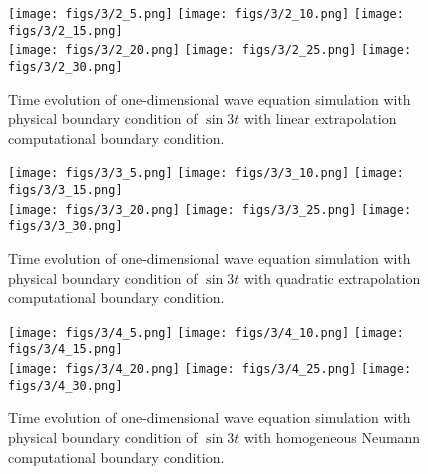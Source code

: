 \documentclass[11pt]{article}
\begin{document}
\begin{enumerate}
        \begin{figure}[ht]
        \begin{center}
        \texttt{[image: figs/3/2\_5.png]}
        \texttt{[image: figs/3/2\_10.png]}
        \texttt{[image: figs/3/2\_15.png]}\\
        \texttt{[image: figs/3/2\_20.png]}
        \texttt{[image: figs/3/2\_25.png]}
        \texttt{[image: figs/3/2\_30.png]}\\
        \end{center}
        \caption{Time evolution of one-dimensional wave equation simulation with physical boundary condition
                of $\sin 3 t$ with linear extrapolation computational boundary condition.}
        \label{fig2_2}
        \end{figure}

        \begin{figure}[ht]
        \begin{center}
        \texttt{[image: figs/3/3\_5.png]}
        \texttt{[image: figs/3/3\_10.png]}
        \texttt{[image: figs/3/3\_15.png]}\\
        \texttt{[image: figs/3/3\_20.png]}
        \texttt{[image: figs/3/3\_25.png]}
        \texttt{[image: figs/3/3\_30.png]}\\
        \end{center}
        \caption{Time evolution of one-dimensional wave equation simulation with physical boundary condition
                of $\sin 3 t$ with quadratic extrapolation computational boundary condition.}
        \label{fig2_3}
        \end{figure}

        \begin{figure}[ht]
        \begin{center}
        \texttt{[image: figs/3/4\_5.png]}
        \texttt{[image: figs/3/4\_10.png]}
        \texttt{[image: figs/3/4\_15.png]}\\
        \texttt{[image: figs/3/4\_20.png]}
        \texttt{[image: figs/3/4\_25.png]}
        \texttt{[image: figs/3/4\_30.png]}\\
        \end{center}
        \caption{Time evolution of one-dimensional wave equation simulation with physical boundary condition
                of $\sin 3 t$ with homogeneous Neumann computational boundary condition.}
        \label{fig2_4}
        \end{figure}



\end{enumerate}
\end{document}
